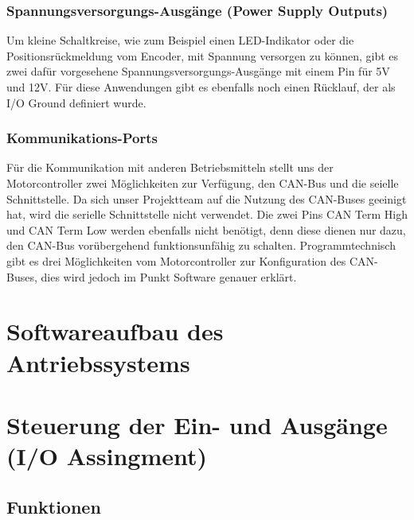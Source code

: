 \subsubsection{Spannungsversorgungs-Ausgänge (Power Supply Outputs)}
Um kleine Schaltkreise, wie zum Beispiel einen LED-Indikator oder die Positionsrückmeldung vom Encoder, mit Spannung versorgen zu können, gibt es zwei dafür vorgesehene Spannungsversorgungs-Ausgänge mit einem Pin für 5V und 12V. Für diese Anwendungen gibt es ebenfalls noch einen Rücklauf, der als I/O Ground definiert wurde.



\subsubsection{Kommunikations-Ports}
Für die Kommunikation mit anderen Betriebsmitteln stellt uns der Motorcontroller zwei Möglichkeiten zur Verfügung, den CAN-Bus und die seielle Schnittstelle. Da sich unser Projektteam auf die Nutzung des CAN-Buses geeinigt hat, wird die serielle Schnittstelle nicht verwendet. Die zwei Pins CAN Term High und CAN Term Low werden ebenfalls nicht benötigt, denn diese dienen nur dazu, den CAN-Bus vorübergehend funktionsunfähig zu schalten. Programmtechnisch gibt es drei Möglichkeiten vom Motorcontroller zur Konfiguration des CAN-Buses, dies wird jedoch im Punkt Software genauer erklärt.





\newpage



\section{Softwareaufbau des Antriebssystems}


\section{ Steuerung der Ein- und Ausgänge (I/O Assingment)}
\subsection{Funktionen}
